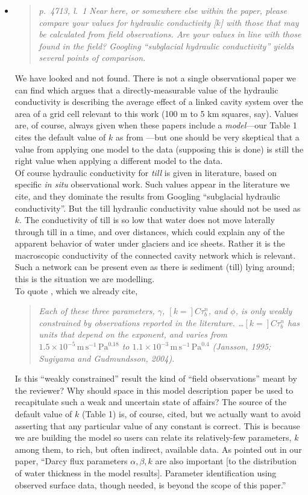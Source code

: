 \documentclass[11pt,reqno]{amsart}
\newcommand{\reply}[2]{
\medskip\medskip
\item  \begin{quote}
\emph{#1}
\end{quote}

\medskip
\noindent #2}
\begin{document}
\begin{itemize}
\reply{p.~4713, l.~1 Near here, or somewhere else within the paper, please compare your
values for hydraulic conductivity [$k$] with those that may be calculated from field observations. Are your values in line with those found in the field? Googling ``subglacial
hydraulic conductivity'' yields several points of comparison.}
{We have looked and not found.  There is not a single observational paper we can find which argues that a directly-measurable value of the hydraulic conductivity is describing the average effect of a linked cavity system over the area of a grid cell relevant to this work (100 m to 5 km squares, say).  Values are, of course, always given when these papers include a \emph{model}---our Table 1 cites the default value of $k$ as from \cite{Schoofetal2012}---but one should be very skeptical that a value from applying one model to the data (supposing this is done) is still the right value when applying a different model to the data. \\
\indent Of course hydraulic conductivity for \emph{till} is given in literature, based on specific \emph{in situ} observational work.  Such values appear in the literature we cite, and they dominate the results from Googling ``subglacial hydraulic conductivity''.  But the till hydraulic conductivity value should not be used as $k$.  The conductivity of till is so low that water does not move laterally through till in a time, and over distances, which could explain any of the apparent behavior of water under glaciers and ice sheets.  Rather it is the macroscopic conductivity of the connected cavity network which is relevant.  Such a network can be present even as there is sediment (till) lying around; this is the situation we are modelling. \\
\indent  To quote \cite{Bartholomausetal2011}, which we already cite, \begin{quote}
\emph{Each of these three parameters, $\gamma$, $[k=]C\tau_b^n$, and $\phi$, is only weakly constrained by observations reported in the literature.  \dots $[k=]C\tau_b^n$ has units that depend on the exponent, and varies from $1.5\times 10^{-5}\, \text{m}\,\text{s}^{-1}\,\text{Pa}^{0.18}$ to $1.1\times 10^{-3}\, \text{m}\,\text{s}^{-1}\,\text{Pa}^{0.4}$ (Jansson, 1995; Sugiyama and Gudmundsson, 2004).}
\end{quote}
Is this ``weakly constrained'' result the kind of ``field observations'' meant by the reviewer?  Why should space in this model description paper be used to recapitulate such a weak and uncertain state of affairs?  The source of the default value of $k$ (Table 1) is, of course, cited, but we actually want to avoid asserting that any particular value of any constant is correct.  This is because we are building the model so users can relate its relatively-few parameters, $k$ among them, to rich, but often indirect, available data.  As pointed out in our paper, ``Darcy flux parameters $\alpha,\beta,k$ are also important [to the distribution of water thickness in the model results].  Parameter identification using observed surface data, though needed, is beyond the scope of this paper.''}


\end{itemize}
\end{document}
